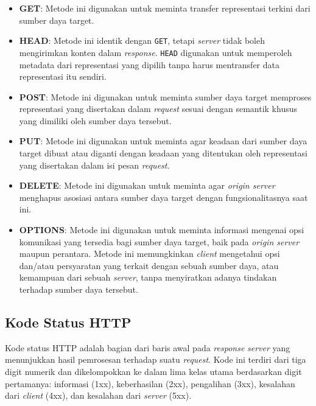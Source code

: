 \begin{itemize}
    \item \textbf{GET}: Metode ini digunakan untuk meminta transfer representasi terkini dari sumber daya target.
  
    \item \textbf{HEAD}: Metode ini identik dengan \texttt{GET}, tetapi \textit{server} tidak boleh mengirimkan konten dalam \textit{response}. \texttt{HEAD} digunakan untuk memperoleh metadata dari representasi yang dipilih tanpa harus mentransfer data representasi itu sendiri.
  
    \item \textbf{POST}: Metode ini digunakan untuk meminta sumber daya target memproses representasi yang disertakan dalam \textit{request} sesuai dengan semantik khusus yang dimiliki oleh sumber daya tersebut.
  
    \item \textbf{PUT}: Metode ini digunakan untuk meminta agar keadaan dari sumber daya target dibuat atau diganti dengan keadaan yang ditentukan oleh representasi yang disertakan dalam isi pesan \textit{request}.
  
    \item \textbf{DELETE}: Metode ini digunakan untuk meminta agar \textit{origin server} menghapus asosiasi antara sumber daya target dengan fungsionalitasnya saat ini.
  
    \item \textbf{OPTIONS}: Metode ini digunakan untuk meminta informasi mengenai opsi komunikasi yang tersedia bagi sumber daya target, baik pada \textit{origin server} maupun perantara. Metode ini memungkinkan \textit{client} mengetahui opsi dan/atau persyaratan yang terkait dengan sebuah sumber daya, atau kemampuan dari sebuah \textit{server}, tanpa menyiratkan adanya tindakan terhadap sumber daya tersebut.
  
\end{itemize}



\subsection{Kode Status HTTP}
\label{subsec:0201-kode-status-http}

Kode status HTTP adalah bagian dari baris awal pada \textit{response} \textit{server} yang menunjukkan hasil pemrosesan terhadap suatu \textit{request}. Kode ini terdiri dari tiga digit numerik dan dikelompokkan ke dalam lima kelas utama berdasarkan digit pertamanya: informasi (1xx), keberhasilan (2xx), pengalihan (3xx), kesalahan dari \textit{client} (4xx), dan kesalahan dari \textit{server} (5xx).

